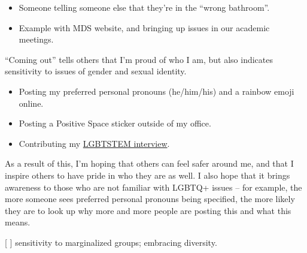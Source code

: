 \documentclass[]{book}
\providecommand{\tightlist}{%
  \setlength{\itemsep}{0pt}\setlength{\parskip}{0pt}}
\begin{document}
\begin{itemize}
\tightlist
\item
  Someone telling someone else that they're in the ``wrong bathroom''.
\item
  Example with MDS website, and bringing up issues in our academic meetings.
\end{itemize}

``Coming out'' tells others that I'm proud of who I am, but also indicates sensitivity to issues of gender and sexual identity.

\begin{itemize}
\tightlist
\item
  Posting my preferred personal pronouns (he/him/his) and a rainbow emoji online.
\item
  Posting a Positive Space sticker outside of my office.
\item
  Contributing my \href{https://lgbtstem.wordpress.com/2019/11/09/an-interview-with-vincenzo-coia/}{LGBTSTEM interview}.
\end{itemize}

As a result of this, I'm hoping that others can feel safer around me, and that I inspire others to have pride in who they are as well. I also hope that it brings awareness to those who are not familiar with LGBTQ+ issues -- for example, the more someone sees preferred personal pronouns being specified, the more likely they are to look up why more and more people are posting this and what this means.

{[} {]} sensitivity to marginalized groups; embracing diversity.
\end{document}
